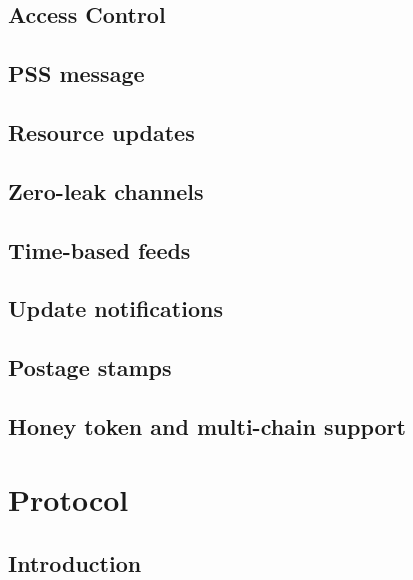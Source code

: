 \section{Access Control}\label{spec:format:access-control}

\section{PSS message}\label{spec:format:pss-messsage}

\section{Resource updates}\label{spec:format:resource-updates}
%
\section{Zero-leak channels}\label{spec:format:zero-leak-channels}
%
\section{Time-based feeds}\label{spec:format:time-based-feeds}
%
\section{Update notifications}\label{spec:format:update-notifications}
%
\section{Postage stamps}\label{spec:format:postage-stamps}

\section{Honey token and multi-chain support}\label{spec:format:honey}
%


\chapter{Protocol}\label{spec:protocol}

\section{Introduction}\label{spec:protocol:intro}
\green{}

